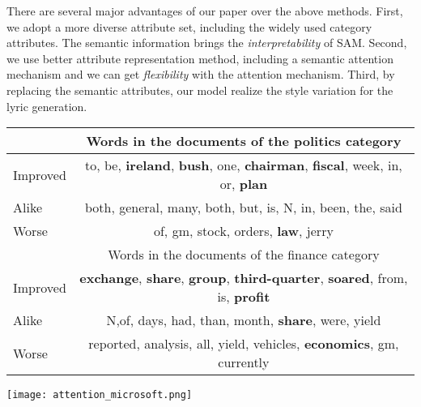 \documentclass[a4paper]{article}
\newcommand{\method}{\xspace{SAM}}
\begin{document}
There are several major advantages of our paper over the above methods. First, we adopt a more diverse attribute set, including the widely used category attributes. The semantic information brings the \emph{interpretability} of \method. Second, we use better attribute representation method, including a semantic attention mechanism and we can get \emph{flexibility} with the attention mechanism. Third, by replacing the semantic attributes, our model realize the style variation for the lyric generation.

\begin{table*}[ht]
\vspace{-0.2cm}
\caption{Word predictions that is improved, alike and worse after adding category attribute in Categories Politics, stocking and finance}
\label{table:word-probablity}
\begin{center}
\setlength\tabcolsep{3pt}
\begin{tabular}{l|c}
\hline\hline
&Words in the documents of the politics category  \\
\hline
Improved &  to, be, \textbf{ireland}, \textbf{bush}, one, \textbf{chairman}, \textbf{fiscal}, week, in, or, \textbf{plan}\\
Alike & both, general, many, both, but, is, N, in, been, the, said\\
Worse & of, gm, stock, orders, \textbf{law}, jerry \\
\hline
 \hline
&Words in the documents of the finance category  \\
\hline
Improved &  \textbf{exchange}, \textbf{share}, \textbf{group}, \textbf{third-quarter}, \textbf{soared}, from, is, \textbf{profit}\\
Alike &N,of, days, had, than, month, \textbf{share}, were, yield\\
Worse & reported, analysis, all, yield, vehicles, \textbf{economics}, gm, currently\\
 \hline
 \hline
\end{tabular}
\end{center}
\end{table*}
\vspace{-0.4cm}
\begin{figure*}[t]\centering
    {
    \texttt{[image: attention\_microsoft.png]}
    }
    \caption{An example of alignment matrix from \method-title (Best viewed in color)}
    \label{fig:attention}
\end{figure*}
\end{document}
